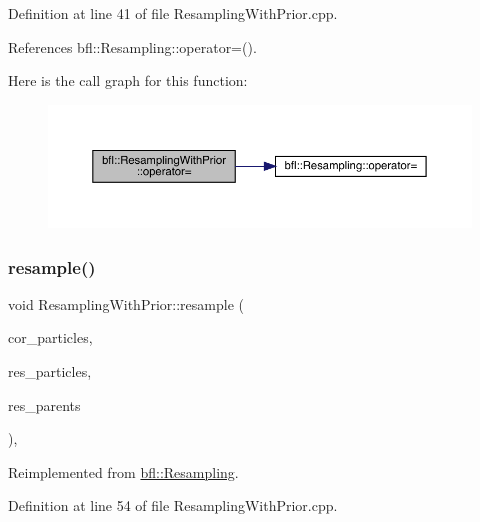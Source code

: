 Definition at line 41 of file Resampling\+With\+Prior.\+cpp.



References bfl\+::\+Resampling\+::operator=().

Here is the call graph for this function\+:
\nopagebreak
\begin{figure}[H]
\begin{center}
\leavevmode
\includegraphics[width=350pt]{classbfl_1_1ResamplingWithPrior_a79ed56028dc2f97f0fb400a481998010_cgraph}
\end{center}
\end{figure}
\mbox{\label{classbfl_1_1ResamplingWithPrior_adc830de19fe1294ea404ced91f0b05d6}} 
\subsubsection{\texorpdfstring{resample()}{resample()}}
{\footnotesize\ttfamily void Resampling\+With\+Prior\+::resample (\begin{DoxyParamCaption}\item[{const \mbox{\hyperlink{classbfl_1_1ParticleSet}{Particle\+Set}} \&}]{cor\+\_\+particles,  }\item[{\mbox{\hyperlink{classbfl_1_1ParticleSet}{Particle\+Set}} \&}]{res\+\_\+particles,  }\item[{Eigen\+::\+Ref$<$ Eigen\+::\+Vector\+Xi $>$}]{res\+\_\+parents }\end{DoxyParamCaption})\hspace{0.3cm}{\ttfamily [override]}, {\ttfamily [virtual]}}



Reimplemented from \mbox{\hyperlink{classbfl_1_1Resampling_a7527025ad8afc6dbae2225213571391c}{bfl\+::\+Resampling}}.



Definition at line 54 of file Resampling\+With\+Prior.\+cpp.



